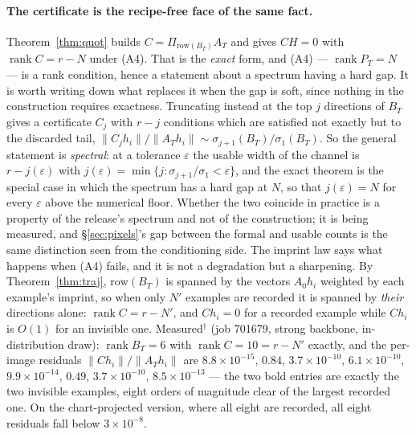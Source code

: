 \paragraph{The certificate is the recipe-free face of the same fact.}
Theorem~\ref{thm:quot} builds $C=\Pi_{\mathrm{row}(B_T)}A_T$ and gives
$CH=0$ with $\operatorname{rank}C=r-N$ under (A4). That is the
\emph{exact} form, and (A4) --- $\operatorname{rank}P_T=N$ --- is a rank
condition, hence a statement about a spectrum having a hard gap. It is worth
writing down what replaces it when the gap is soft, since nothing in the
construction requires exactness. Truncating instead at the top $j$ directions
of $B_T$ gives a certificate $C_j$ with $r-j$ conditions which are satisfied
not exactly but to the discarded tail, $\|C_jh_i\|/\|A_Th_i\|\sim
\sigma_{j+1}(B_T)/\sigma_1(B_T)$. So the general statement is
\emph{spectral}: at a tolerance $\varepsilon$ the usable width of the channel
is $r-j(\varepsilon)$ with $j(\varepsilon)=\min\{j:\sigma_{j+1}/\sigma_1<
\varepsilon\}$, and the exact theorem is the special case in which the
spectrum has a hard gap at $N$, so that $j(\varepsilon)=N$ for every
$\varepsilon$ above the numerical floor. Whether the two coincide in practice
is a property of the release's spectrum and not of the construction; it is
being measured, and \S\ref{sec:pixels}'s gap between the formal and usable
counts is the same distinction seen from the conditioning side. The imprint law says what
happens when (A4) fails, and it is not a degradation but a sharpening. By
Theorem~\ref{thm:traj}, $\mathrm{row}(B_T)$ is spanned by the vectors
$A_0h_i$ weighted by each example's imprint, so when only $N'$ examples are
recorded it is spanned by \emph{their} directions alone: $\operatorname{rank}
C=r-N'$, and $Ch_i=0$ for a recorded example while $Ch_i$ is $O(1)$ for an
invisible one. Measured$^\dagger$ (job 701679, strong backbone,
in-distribution draw): $\operatorname{rank}B_T=6$ with
$\operatorname{rank}C=10=r-N'$ exactly, and the per-image residuals
$\|Ch_i\|/\|A_Th_i\|$ are $8.8\times10^{-15}$, $\mathbf{0.84}$,
$3.7\times10^{-10}$, $6.1\times10^{-10}$, $9.9\times10^{-14}$,
$\mathbf{0.49}$, $3.7\times10^{-10}$, $8.5\times10^{-13}$ — the two bold
entries are exactly the two invisible examples, eight orders of magnitude
clear of the largest recorded one. On the chart-projected version, where all
eight are recorded, all eight residuals fall below $3\times10^{-8}$.

